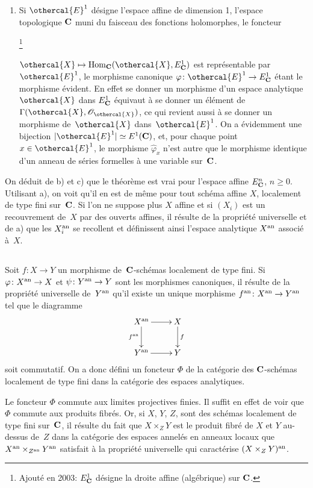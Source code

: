 \begin{enumerate}
\item [c)] Si $\othercal{E}^1$ d\'esigne l'espace affine de dimension 1,
\ie l'espace topologique $\mathbf{C}$ muni du faisceau des fonctions
holomorphes, le foncteur{\renewcommand{\thefootnote}{*}\addtocounter{footnote}{-1}\footnote{\lcrochetbf Ajout\'e en 2003: $E^1_{\mathbf{C}}$ d\'esigne la droite affine (alg\'ebrique) sur $\mathbf{C}$.\rcrochetbf}}
$\othercal{X}\mto\Hom_\CC (\othercal{X},E^1_\CC)$
est repr\'esentable par $\othercal{E}^1$, le morphisme canonique
$\varphi\colon\othercal{E}^1\to E^1_\CC$ \'etant le morphisme
\'evident. En effet se donner un morphisme d'un espace analytique
$\othercal{X}$ dans $E^1_{\mathbf{C}}$ \'equivaut \`a se donner un
\'el\'ement de~$\Gamma(\othercal{X},\cal{O}_\othercal{X})$, ce qui revient
aussi \`a se donner un morphisme de~$\othercal{X}$ dans~$\othercal{E}^1$. On
a \'evidemment une bijection $|\othercal{E}^1|\simeq E^1(\CC)$, et, pour
chaque point $x\in\othercal{E}^1$, le morphisme $\widehat\varphi_x$ n'est
autre que le morphisme identique d'un anneau de s\'eries formelles
\`a une variable sur~$\mathbf{C}$.
\end{enumerate}

\enlargethispage{.5cm}On d\'eduit de b) et c) que le th\'eor\`eme est vrai pour
l'espace affine $E^n_{\mathbf{C}}$, $n\geq 0$. Utilisant a), on voit qu'il en
est de m\^eme pour tout sch\'ema affine $X$, localement de type
fini sur~$\mathbf{C}$. Si l'on ne suppose plus $X$ affine et si $(X_i)$ est
un recouvrement de~$X$ par des ouverts affines, il r\'esulte de la
propri\'et\'e universelle et de a) que les $X_i^{\mathrm{an}}$ se recollent
et d\'efinissent ainsi l'espace analytique $X^{\mathrm{an}}$ associ\'e
\`a~$X$.

\subsection{}
\label{XII.1.2}
Soit $f\colon X\to Y$ un morphisme de~$\mathbf{C}$-sch\'emas localement de
type fini. Si $\varphi\colon X^{\an}\to X$ et $\psi\colon Y^{\an}\to
Y$ sont les morphismes canoniques, il r\'esulte de la
propri\'et\'e universelle de~$Y^{\mathrm{an}}$ qu'il existe un unique
morphisme $f^{\an}\colon X^{\an}\to Y^{\an}$ tel que le diagramme
$$
\xymatrix{{X^{\an}}\ar[r]\ar[d]_-{f^{\an}}&{X}\ar[d]^-f\\{Y^{\an}}\ar[r]&{Y}}
$$
soit
commutatif. On a donc d\'efini un foncteur $\Phi$ de la
cat\'egorie des $\mathbf{C}$-sch\'emas localement de type fini dans la
cat\'egorie des espaces analytiques.

Le foncteur $\Phi$ commute aux limites projectives finies. Il suffit
en effet de voir que $\Phi$ commute aux produits fibr\'es. Or, si
$X$, $Y$, $Z$, sont des sch\'emas localement de type fini sur~$\mathbf{C}$,
il r\'esulte du fait que $X\times_Z Y$ est le produit fibr\'e de
$X$ et $Y$ au-dessus de~$Z$ dans la cat\'egorie des espaces
annel\'es en anneaux locaux que $X^{\mathrm{an}}\times_{Z^{\mathrm{an}}}Y^{\mathrm{an}}$
satisfait \`a la propri\'et\'e universelle qui caract\'erise
$(X\times_Z Y)^{\mathrm{an}}$.


